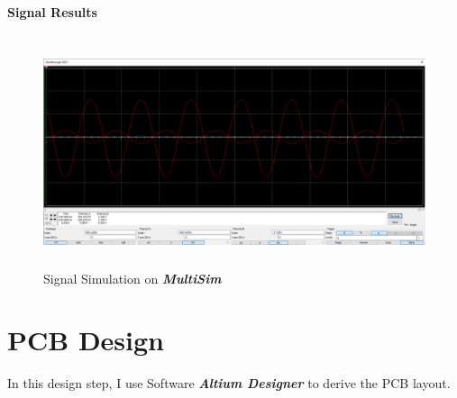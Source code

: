 \documentclass[twoside, a4paper, leqno]{article}
\begin{document}
		\subsection{Signal Results}
			\begin{center}
				\begin{figure}[htp]
					\begin{center}
						\includegraphics[height=6.7cm]{figure/final_simu.png}
					\end{center}
					\caption{Signal Simulation on \textit{\textbf{MultiSim}}}
					\label{refFigure10}
				\end{figure}
			\end{center}
		
	\newpage
	\part{PCB Design}
		In this design step, I use Software \textbf{\textit{Altium Designer}} to derive the PCB layout.
\end{document}
